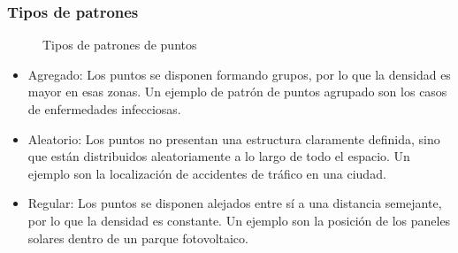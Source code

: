 \subsubsection{Tipos de patrones}
\begin{figure}[H]
    \centering
    \caption{Tipos de patrones de puntos} \label{fig:patrones} 
\end{figure} 
\begin{itemize}
    \item Agregado: Los puntos se disponen formando grupos, por lo que la densidad es mayor en esas zonas. Un ejemplo de patrón de puntos agrupado son los casos de enfermedades infecciosas.
    \item Aleatorio: Los puntos no presentan una estructura claramente definida, sino que están distribuidos aleatoriamente a lo largo de todo el espacio.
    Un ejemplo son la localización de accidentes de tráfico en una ciudad.
    \item Regular: Los puntos se disponen alejados entre sí a una distancia semejante, por lo que la densidad es constante. 
    Un ejemplo son la posición de los paneles solares dentro de un parque fotovoltaico. 
\end{itemize}

